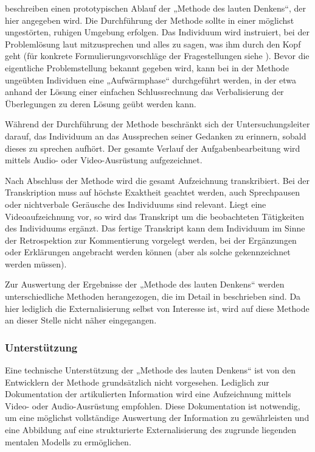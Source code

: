 \citet{Van-Someren94} beschreiben einen prototypischen Ablauf der „Methode des lauten Denkens“, der hier angegeben wird. Die Durchführung der Methode sollte in einer möglichst ungestörten, ruhigen Umgebung erfolgen. Das Individuum wird instruiert, bei der Problemlösung laut mitzusprechen und alles zu sagen, was ihm durch den Kopf geht (für konkrete Formulierungsvorschläge der Fragestellungen siehe \citep[][S. 43]{Van-Someren94}). Bevor die eigentliche Problemstellung bekannt gegeben wird, kann bei in der Methode ungeübten Individuen eine „Aufwärmphase“ durchgeführt werden, in der etwa anhand der Lösung einer einfachen Schlussrechnung das Verbalisierung der Überlegungen zu deren Lösung geübt werden kann.

Während der Durchführung der Methode beschränkt sich der Untersuchungsleiter darauf, das Individuum an das Aussprechen seiner Gedanken zu erinnern, sobald dieses zu sprechen aufhört. Der gesamte Verlauf der Aufgabenbearbeitung wird mittels Audio- oder Video-Ausrüstung aufgezeichnet.

Nach Abschluss der Methode wird die gesamt Aufzeichnung transkribiert. Bei der Transkription muss auf höchste Exaktheit geachtet werden, auch Sprechpausen oder nichtverbale Geräusche des Individuums sind relevant. Liegt eine Videoaufzeichnung vor, so wird das Transkript um die beobachteten Tätigkeiten des Individuums ergänzt. Das fertige Transkript kann dem Individuum im Sinne der Retrospektion zur Kommentierung vorgelegt werden, bei der Ergänzungen oder Erklärungen angebracht werden können (aber als solche gekennzeichnet werden müssen).

Zur Auswertung der Ergebnisse der „Methode des lauten Denkens“ werden unterschiedliche Methoden herangezogen, die im Detail in \citep{Van-Someren94} beschrieben sind. Da hier lediglich die Externalisierung selbst von Interesse ist, wird auf diese Methode an dieser Stelle nicht näher eingegangen.

\subsubsection{Unterstützung}

Eine technische Unterstützung der „Methode des lauten Denkens“ ist von den Entwicklern der Methode \citep{Van-Someren94} grundsätzlich nicht vorgesehen. Lediglich zur Dokumentation der artikulierten Information wird eine Aufzeichnung mittels Video- oder Audio-Ausrüstung empfohlen. Diese Dokumentation ist notwendig, um eine möglichst vollständige Auswertung der Information zu gewährleisten und eine Abbildung auf eine strukturierte Externalisierung des zugrunde liegenden mentalen Modells zu ermöglichen. 

